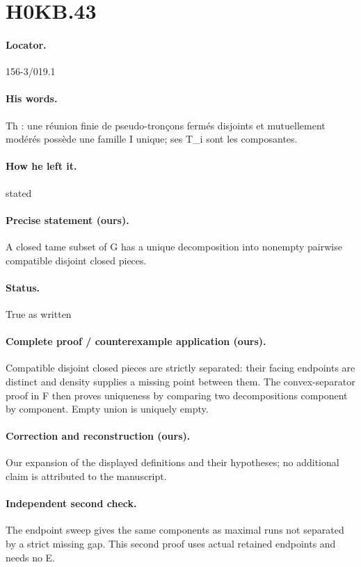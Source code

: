 \section*{H0KB.43}\label{statement:H0KB.43}
\paragraph{Locator.} 156-3/019.1

\paragraph{His words.} Th : une réunion finie de pseudo-tronçons fermés disjoints et mutuellement modérés possède une famille I unique; ses T\_i sont les composantes.

\paragraph{How he left it.} stated

\paragraph{Precise statement (ours).} A closed tame subset of G has a unique decomposition into nonempty pairwise compatible disjoint closed pieces.

\paragraph{Status.} True as written

\paragraph{Complete proof / counterexample application (ours).} Compatible disjoint closed pieces are strictly separated: their facing endpoints are distinct and density supplies a missing point between them. The convex-separator proof in F then proves uniqueness by comparing two decompositions component by component. Empty union is uniquely empty.

\paragraph{Correction and reconstruction (ours).} Our expansion of the displayed definitions and their hypotheses; no additional claim is attributed to the manuscript.

\paragraph{Independent second check.} The endpoint sweep gives the same components as maximal runs not separated by a strict missing gap. This second proof uses actual retained endpoints and needs no E.


